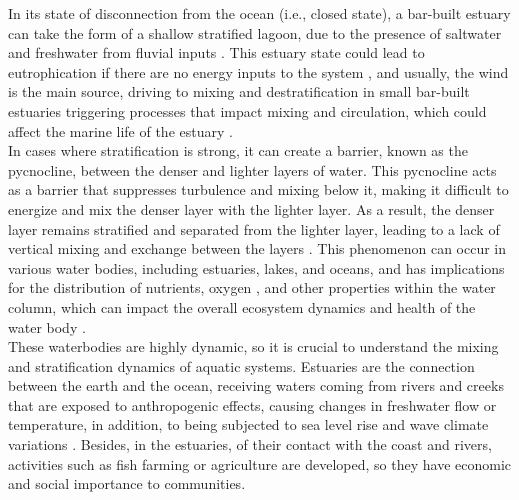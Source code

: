 \documentclass[tesis.tex]{subfiles}
\begin{document}
In its state of disconnection from the ocean (i.e., closed state), a bar-built estuary can take the form of a shallow stratified lagoon, due to the presence of saltwater and freshwater from fluvial inputs \citep{Behrens2016}. This estuary state could lead to eutrophication if there are no energy inputs to the system \citep{nunes2014responses}, and usually, the wind is the main source, driving to mixing and destratification in small bar-built estuaries \citep{Gale2006} triggering processes that impact mixing and circulation, which could affect the marine life of the estuary \citep{marti2008relating}. \\

In cases where stratification is strong, it can create a barrier, known as the pycnocline, between the denser and lighter layers of water. This pycnocline acts as a barrier that suppresses turbulence and mixing below it, making it difficult to energize and mix the denser layer with the lighter layer. As a result, the denser layer remains stratified and separated from the lighter layer, leading to a lack of vertical mixing and exchange between the layers \citep{Cousins2010}. This phenomenon can occur in various water bodies, including estuaries, lakes, and oceans, and has implications for the distribution of nutrients, oxygen \citep{Kelly2018}, and other properties within the water column, which can impact the overall ecosystem dynamics and health of the water body \citep{marti2008relating}.\\  

These waterbodies are highly dynamic, so it is crucial to understand the mixing and stratification dynamics of aquatic systems. Estuaries are the connection between the earth and the ocean, receiving waters coming from rivers and creeks that are exposed to anthropogenic effects, causing changes in freshwater flow or temperature, in addition, to being subjected to sea level rise and wave climate variations \citep{grez2020evidence, holt2010potential, thorne2021wetlands}. Besides, in the estuaries, of their contact with the coast and rivers, activities such as fish farming or agriculture are developed, so they have economic and social importance to communities. \\
\end{document}
